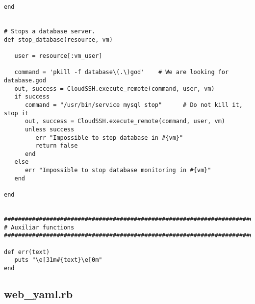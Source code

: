 \begin{lstlisting}
end


# Stops a database server.
def stop_database(resource, vm)

   user = resource[:vm_user]

   command = 'pkill -f database\(.\)god'    # We are looking for database.god
   out, success = CloudSSH.execute_remote(command, user, vm)
   if success
      command = "/usr/bin/service mysql stop"      # Do not kill it, stop it
      out, success = CloudSSH.execute_remote(command, user, vm)
      unless success
         err "Impossible to stop database in #{vm}"
         return false
      end
   else
      err "Impossible to stop database monitoring in #{vm}"
   end

end


################################################################################
# Auxiliar functions
################################################################################

def err(text)
   puts "\e[31m#{text}\e[0m"
end

\end{lstlisting}


\subsection{web\_yaml.rb}


